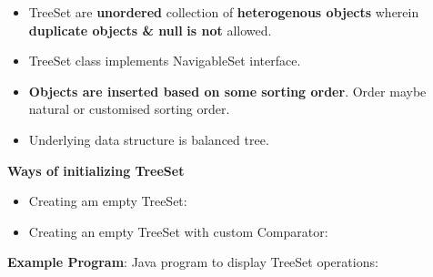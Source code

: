 \setlength{\columnsep}{3pt}
\begin{flushleft}

	\begin{itemize}
		\item TreeSet are \textbf{unordered} collection of \textbf{heterogenous objects} wherein \textbf{duplicate objects \& null} \textbf{is not} allowed. 
		\item TreeSet class implements NavigableSet interface.
		\item \textbf{Objects are inserted based on some sorting order}. Order maybe  natural or customised sorting order.
		\item Underlying data structure is balanced tree.
			
	\end{itemize}
	
	\textbf{Ways of initializing TreeSet}
	
	\begin{itemize}
		\item Creating am empty TreeSet:
		\bigskip
		
		\bigskip
				
		\item Creating an empty TreeSet with custom Comparator:
		\bigskip
		
	\end{itemize}
	
	\newpage
	\textbf{Example Program}:
	\newline
	Java program to display TreeSet operations:
	

\end{flushleft}
